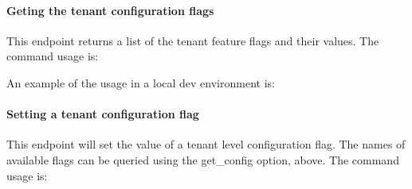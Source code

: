 \hypertarget{geting-the-tenant-configuration-flags}{%
\paragraph{Geting the tenant configuration
flags}\label{geting-the-tenant-configuration-flags}}

This endpoint returns a list of the tenant feature flags and their
values. The command usage is:

\begin{Shaded}
\begin{Highlighting}[]
\NormalTok{                               [}\NormalTok{] [--admin_password]}
\end{Highlighting}
\end{Shaded}

An example of the usage in a local dev environment is:

\begin{Shaded}
\begin{Highlighting}[]
 
\end{Highlighting}
\end{Shaded}

\hypertarget{setting-a-tenant-configuration-flag}{%
\paragraph{Setting a tenant configuration
flag}\label{setting-a-tenant-configuration-flag}}

This endpoint will set the value of a tenant level configuration flag.
The names of available flags can be queried using the get\_config
option, above. The command usage is:

\begin{Shaded}
\begin{Highlighting}[]
\NormalTok{                               [}\NormalTok{] [--admin_password]}
\NormalTok{                               [}\NormalTok{] [--config-value]}
\end{Highlighting}
\end{Shaded}

